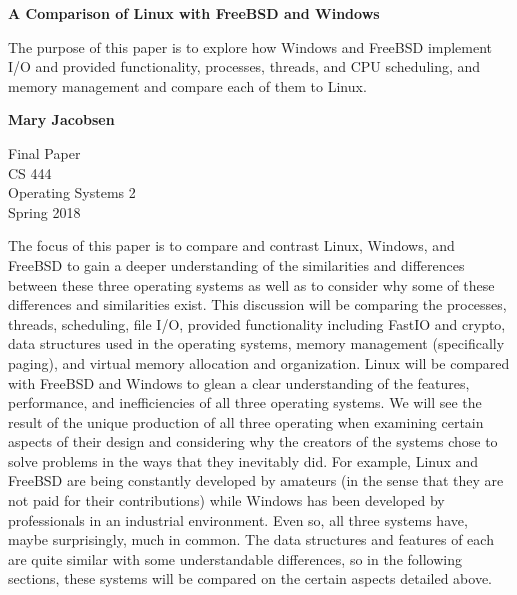 \documentclass[letterpaper,10pt,draftclsnofoot,onecolumn,]{IEEEtran}
\begin{document}
\begin{titlepage}
    \begin{center}
        \vspace*{1cm}
        
        \textbf{A Comparison of Linux with FreeBSD and Windows}
        
        \vspace{0.5cm}
        The purpose of this paper is to explore how Windows and FreeBSD implement I/O and provided functionality, processes, threads, and CPU scheduling, and memory management and compare each of them to Linux.
        
        \vspace{1.5cm}
        
        \textbf{Mary Jacobsen}
        
        Final Paper\\
        CS 444\\
        Operating Systems 2\\
        Spring 2018
        
    \end{center}
\end{titlepage}
The focus of this paper is to compare and contrast Linux, Windows, and FreeBSD to gain a deeper understanding of the similarities and differences between these three operating systems as well as to consider why some of these differences and similarities exist.
This discussion will be comparing the processes, threads, scheduling, file I/O, provided functionality including FastIO and crypto, data structures used in the operating systems, memory management (specifically paging), and virtual memory allocation and organization. Linux will be compared with FreeBSD and Windows to glean a clear understanding of the features, performance, and inefficiencies of all three operating systems. We will see the result of the unique production of all three operating when examining certain aspects of their design and considering why the creators of the systems chose to solve problems in the ways that they inevitably did. For example, Linux and FreeBSD are being constantly developed by amateurs (in the sense that they are not paid for their contributions) while Windows has been developed by professionals in an industrial environment. Even so, all three systems have, maybe surprisingly, much in common. The data structures and features of each are quite similar with some understandable differences, so in the following sections, these systems will be compared on the certain aspects detailed above.
\end{document}

